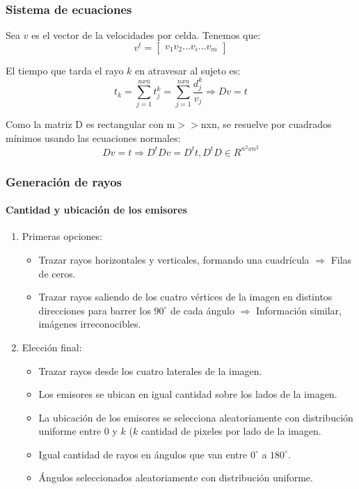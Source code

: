\documentclass[11pt]{beamer}
\begin{document}
\begin{frame}
\frametitle{Sistema de ecuaciones}
\par Sea $v$ es el vector de la velocidades por celda. Tenemos que:
$$
v^t=\left[
\begin{array}{c}
v_1 
v_2 
... 
v_i 
... 
v_{m} 
\end{array}
\right]
$$
\par El tiempo que tarda el rayo $k$ en atravesar al sujeto es:
$$t_{k}=\sum_{j=1}^{nxn}t^k_{j} = \sum_{j=1}^{nxn} \dfrac{d^k_j}{v_{j}} \Rightarrow Dv=t
$$
\par Como la matriz D es rectangular con m$>>$nxn, se resuelve por cuadrados mínimos usando las ecuaciones normales:
$$
Dv=t \Rightarrow D^tDv=D^tt, D^tD \in R^{n^2 x n^2}
$$
\end{frame}


\begin{frame}
\frametitle{Generación de rayos}
\framesubtitle{Cantidad y ubicación de los emisores}

\begin{enumerate}
    \item Primeras opciones:
    \begin{itemize}
        \item Trazar rayos horizontales y verticales, formando una cuadrícula $\Rightarrow$ Filas de ceros.
        \item Trazar rayos saliendo de los cuatro vértices de la imagen en distintos direcciones para barrer los $90^{\circ}$ de cada ángulo $\Rightarrow$ Información similar, imágenes irreconocibles.
    \end{itemize}
    \item Elección final:
    \begin{itemize}
        
    \item Trazar rayos desde los cuatro laterales de la imagen.
    \item Los emisores se ubican en igual cantidad sobre los lados de la imagen.
    \item La ubicación de los emisores se selecciona aleatoriamente con distribución uniforme entre $0$ y $k$ ($k$ cantidad de pixeles por lado de la imagen.
    \item Igual cantidad de rayos en ángulos que van entre $0^{\circ}$ a $180^{\circ}$.
    \item Ángulos seleccionados aleatoriamente con distribución uniforme.
    \end{itemize}

\end{enumerate}

\end{frame}
\end{document}
